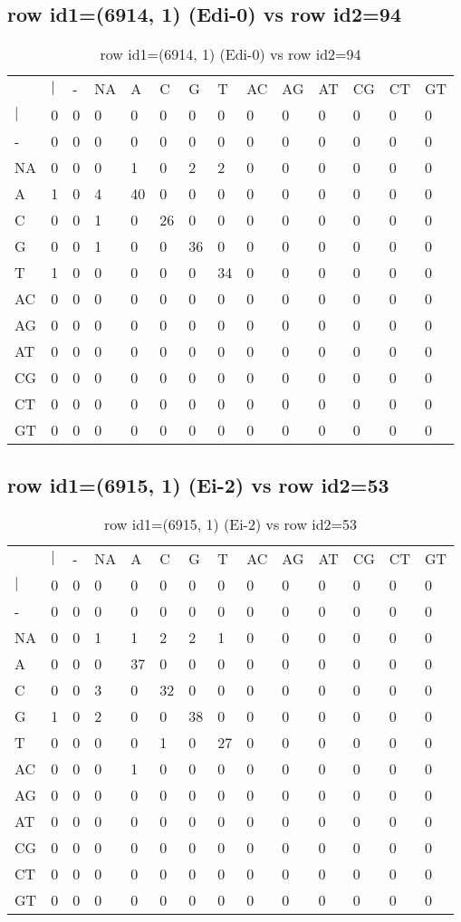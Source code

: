 \subsection{row id1=(6914, 1) (Edi-0) vs row id2=94}
\begin{center}
\begin{longtable}{|l|l|l|l|l|l|l|l|l|l|l|l|l|l|}
\caption{row id1=(6914, 1) (Edi-0) vs row id2=94} \label{table_dm94}\\
\hline
\\
\hline
&$|$&-&NA&A&C&G&T&AC&AG&AT&CG&CT&GT\\
$|$&0&0&0&0&0&0&0&0&0&0&0&0&0\\
-&0&0&0&0&0&0&0&0&0&0&0&0&0\\
NA&0&0&0&1&0&2&2&0&0&0&0&0&0\\
A&1&0&4&40&0&0&0&0&0&0&0&0&0\\
C&0&0&1&0&26&0&0&0&0&0&0&0&0\\
G&0&0&1&0&0&36&0&0&0&0&0&0&0\\
T&1&0&0&0&0&0&34&0&0&0&0&0&0\\
AC&0&0&0&0&0&0&0&0&0&0&0&0&0\\
AG&0&0&0&0&0&0&0&0&0&0&0&0&0\\
AT&0&0&0&0&0&0&0&0&0&0&0&0&0\\
CG&0&0&0&0&0&0&0&0&0&0&0&0&0\\
CT&0&0&0&0&0&0&0&0&0&0&0&0&0\\
GT&0&0&0&0&0&0&0&0&0&0&0&0&0\\
\hline
\end{longtable}
\end{center}

\subsection{row id1=(6915, 1) (Ei-2) vs row id2=53}
\begin{center}
\begin{longtable}{|l|l|l|l|l|l|l|l|l|l|l|l|l|l|}
\caption{row id1=(6915, 1) (Ei-2) vs row id2=53} \label{table_dm96}\\
\hline
\\
\hline
&$|$&-&NA&A&C&G&T&AC&AG&AT&CG&CT&GT\\
$|$&0&0&0&0&0&0&0&0&0&0&0&0&0\\
-&0&0&0&0&0&0&0&0&0&0&0&0&0\\
NA&0&0&1&1&2&2&1&0&0&0&0&0&0\\
A&0&0&0&37&0&0&0&0&0&0&0&0&0\\
C&0&0&3&0&32&0&0&0&0&0&0&0&0\\
G&1&0&2&0&0&38&0&0&0&0&0&0&0\\
T&0&0&0&0&1&0&27&0&0&0&0&0&0\\
AC&0&0&0&1&0&0&0&0&0&0&0&0&0\\
AG&0&0&0&0&0&0&0&0&0&0&0&0&0\\
AT&0&0&0&0&0&0&0&0&0&0&0&0&0\\
CG&0&0&0&0&0&0&0&0&0&0&0&0&0\\
CT&0&0&0&0&0&0&0&0&0&0&0&0&0\\
GT&0&0&0&0&0&0&0&0&0&0&0&0&0\\
\hline
\end{longtable}
\end{center}

